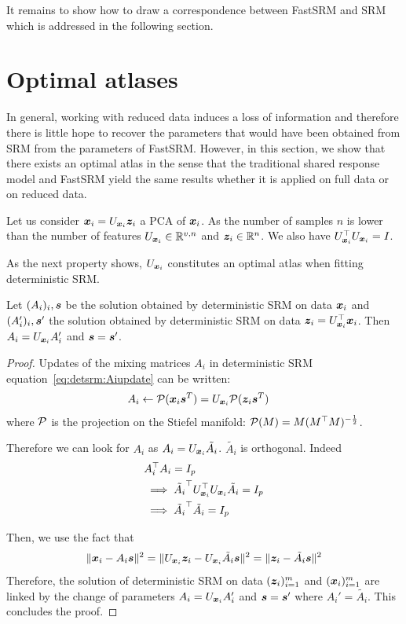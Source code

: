 It remains to show how to draw a correspondence between FastSRM and SRM which is
addressed in the following section.

\section{Optimal atlases}
In general, working with reduced data induces a loss of information and
therefore there is little hope to recover the parameters that would have been
obtained from SRM from the parameters of FastSRM.
However, in this section, we show that there exists an optimal atlas in the sense
that the traditional shared response model and FastSRM yield the same
results whether it is applied on full data or on reduced data.

Let us consider $\boldsymbol{x}_i = U_{\boldsymbol{x}_i} \boldsymbol{z}_i$ a PCA of $\boldsymbol{x}_i$. As the number of
samples $n$ is lower than the number of features $U_{\boldsymbol{x}_i} \in \mathbb{R}^{v, n}$ and
$\boldsymbol{z}_i \in \mathbb{R}^{n}$.  We also have $U_{\boldsymbol{x}_i}^{\top}U_{\boldsymbol{x}_i} = I$.

As the next property shows, $U_{\boldsymbol{x}_i}$ constitutes an optimal atlas when
fitting deterministic SRM.
\begin{prop}
  Let $(A_i)_i, \boldsymbol{s}$ be the solution obtained by deterministic SRM on data
  $\boldsymbol{x}_i$ and $(A_i')_i, \boldsymbol{s}'$ the solution obtained by deterministic SRM on
  data $\boldsymbol{z}_i = U_{\boldsymbol{x}_i}^{\top} \boldsymbol{x}_i$. Then $A_i = U_{\boldsymbol{x}_i}A_i'$ and $\boldsymbol{s} = \boldsymbol{s}'$. 
\label{prop:optimaldetsrm}
\end{prop}
\begin{proof}
Updates of the mixing matrices $A_i$ in deterministic SRM
equation~\eqref{eq:detsrm:Aiupdate} can be written:
\begin{align}
  A_i &\leftarrow \mathcal{P}(\boldsymbol{x}_i \boldsymbol{s}^T)= U_{\boldsymbol{x}_i}\mathcal{P}(\boldsymbol{z}_i \boldsymbol{s}^T)
  \label{eq:fastdetsrm:Aiupdate}
\end{align}
where $\mathcal{P}$ is the projection on the Stiefel manifold: $\mathcal{P}(M) = M
(M^{\top}M)^{-\frac12}$.


Therefore we can look for $A_i$ as $A_i = U_{\boldsymbol{x}_i} \tilde{A_i}$. $\tilde{A_i}$ is
orthogonal. Indeed
\begin{align}
  &A_i^{\top} A_i = I_p \\
  & \implies \tilde{A_i}^{\top}U_{\boldsymbol{x}_i}^{\top} U_{\boldsymbol{x}_i} \tilde{A_i} = I_p \\
  & \implies \tilde{A_i}^{\top} \tilde{A_i} = I_p
\end{align}

Then, we use the fact that
\begin{align}
  \|\boldsymbol{x}_i - A_i \boldsymbol{s} \|^2 = \| U_{\boldsymbol{x}_i}\boldsymbol{z}_i - U_{\boldsymbol{x}_i}\tilde{A_i} \boldsymbol{s}\|^2 = \| \boldsymbol{z}_i - \tilde{A_i} \boldsymbol{s} \|^2
  \label{eq:equality:xy}
\end{align}
Therefore, the solution of deterministic SRM on data $(\boldsymbol{z}_i)_{i=1}^m$ and
$(\boldsymbol{x}_i)_{i=1}^m$ are linked by the change of parameters $A_i = U_{\boldsymbol{x}_i}A_i'$ and
$\boldsymbol{s} = \boldsymbol{s}'$ where $A_i' = \tilde{A_i}$. This concludes the proof.
\end{proof}

